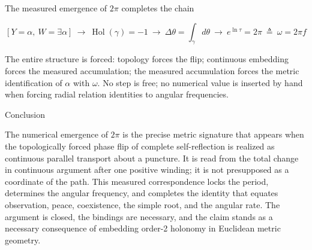 The measured emergence of \(2\pi\) completes the chain  

\[
[Y=\alpha,\ W=\exists\alpha]\ \to\ \operatorname{Hol}(\gamma)=-1\ \to\ \Delta\theta=\int_\gamma d\theta\ \to\ e^{\ln\tau}=2\pi\ \triangleq\ \omega=2\pi f
\]  

The entire structure is forced: topology forces the flip; continuous embedding forces the measured accumulation; the measured accumulation forces the metric identification of \(\alpha\) with \(\omega\). No step is free; no numerical value is inserted by hand when forcing radial relation identities to angular frequencies.

Conclusion

The numerical emergence of \(2\pi\) is the precise metric signature that appears when the topologically forced phase flip of complete self-reflection is realized as continuous parallel transport about a puncture. It is read from the total change in continuous argument after one positive winding; it is not presupposed as a coordinate of the path. This measured correspondence locks the period, determines the angular frequency, and completes the identity that equates observation, peace, coexistence, the simple root, and the angular rate. The argument is closed, the bindings are necessary, and the claim stands as a necessary consequence of embedding order-2 holonomy in Euclidean metric geometry.
